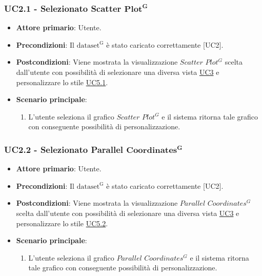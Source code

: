 \subsubsection{UC2.1 - Selezionato Scatter ${\mathbf{Plot^{G}}}$}
\label{sec:UC2.1}
\begin{itemize}
    \item \textbf{Attore primario}: Utente.
    \item \textbf{Precondizioni}: Il ${\mathrm{dataset^{G}}}$ è stato caricato correttamente [UC2].
    \item \textbf{Postcondizioni}: Viene mostrata la visualizzazione $Scatter$ $Plot^{G}$ scelta dall'utente con possibilità di selezionare una diversa vista \hyperref[sec:UC3]{UC3} e personalizzare lo stile \hyperref[sec:UC5.1]{UC5.1}. %
    \item \textbf{Scenario principale}:
          \begin{enumerate}
              \item L'utente seleziona il grafico $Scatter$ $Plot^{G}$ e il sistema ritorna tale grafico con conseguente possibilità di personalizzazione. 
          \end{enumerate}
\end{itemize}

\subsubsection{UC2.2 - Selezionato Parallel ${\mathbf{Coordinates^{G}}}$}
\label{sec:UC2.2}
\begin{itemize}
    \item \textbf{Attore primario}: Utente.
    \item \textbf{Precondizioni}: Il ${\mathrm{dataset^{G}}}$ è stato caricato correttamente [UC2].
    \item \textbf{Postcondizioni}: Viene mostrata la visualizzazione $Parallel$ $Coordinates^{G}$ scelta dall'utente con possibilità di selezionare una diversa vista \hyperref[sec:UC3]{UC3} e personalizzare lo stile \hyperref[sec:UC5.2]{UC5.2}. %
    \item \textbf{Scenario principale}:
          \begin{enumerate}
              \item L'utente seleziona il grafico $Parallel$ $Coordinates^{G}$ e il sistema ritorna tale grafico con conseguente possibilità di personalizzazione. 
          \end{enumerate}
\end{itemize}

